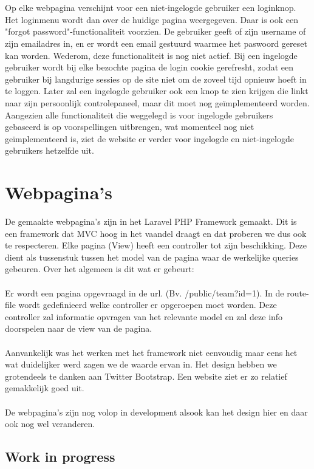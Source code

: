 \documentclass[11pt, a4paper]{article}
\begin{document}
\\
\\
Op elke webpagina verschijnt voor een niet-ingelogde gebruiker een loginknop. Het loginmenu wordt dan over de huidige pagina weergegeven. Daar is ook een "forgot password"-functionaliteit voorzien. De gebruiker geeft of zijn username of zijn emailadres in, en er wordt een email gestuurd waarmee het paswoord gereset kan worden. Wederom, deze functionaliteit is nog niet actief. Bij een ingelogde gebruiker wordt bij elke bezochte pagina de login cookie gerefresht, zodat een gebruiker bij langdurige sessies op de site niet om de zoveel tijd opnieuw hoeft in te loggen. Later zal een ingelogde gebruiker ook een knop te zien krijgen die linkt naar zijn persoonlijk controlepaneel, maar dit moet nog ge\"implementeerd worden. Aangezien alle functionaliteit die weggelegd is voor ingelogde gebruikers gebaseerd is op voorspellingen uitbrengen, wat momenteel nog niet ge\"implementeerd is, ziet de website er verder voor ingelogde en niet-ingelogde gebruikers hetzelfde uit.

\section{Webpagina's}
De gemaakte webpagina's zijn in het Laravel PHP Framework gemaakt. Dit is een framework dat MVC hoog in het vaandel draagt en dat proberen we dus ook te respecteren.
Elke pagina (View) heeft een controller tot zijn beschikking. Deze dient als tussenstuk tussen het model van de pagina waar de werkelijke queries gebeuren. Over het algemeen is dit wat er gebeurt:
\\
\\
Er wordt een pagina opgevraagd in de url. (Bv. /public/team?id=1). In de route-file wordt gedefinieerd welke controller er opgeroepen moet worden. Deze controller zal informatie opvragen van het
relevante model en zal deze info doorspelen naar de view van de pagina.
\\
\\
Aanvankelijk was het werken met het framework niet eenvoudig maar eens het wat duidelijker werd zagen we de waarde ervan in.
Het design hebben we grotendeels te danken aan Twitter Bootstrap. Een website ziet er zo relatief gemakkelijk goed uit.
\\
\\
De webpagina's zijn nog volop in development alsook kan het design hier en daar ook nog wel veranderen.
 
\subsection{Work in progress}
 
\end{document}
